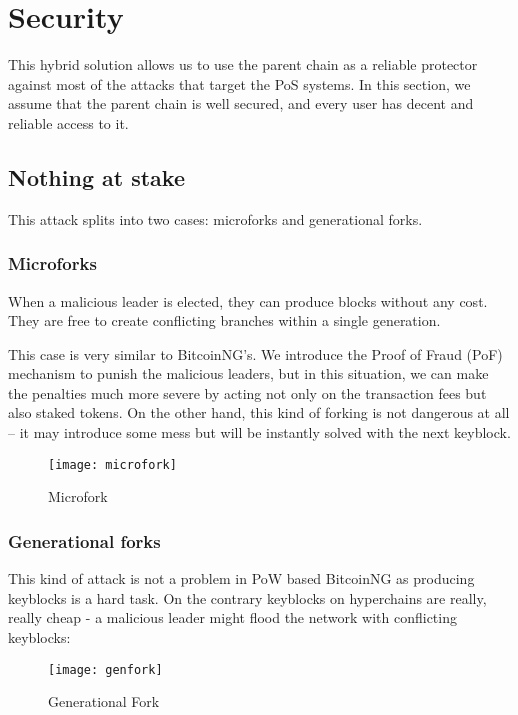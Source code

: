 \section{Security}

This hybrid solution allows us to use the parent chain as a
reliable protector against most of the attacks that target the PoS systems.
\cite{pos_attacks}
In this section, we assume that the parent chain is well secured, and every
user has decent and reliable access to it.

\subsection{Nothing at stake}

This attack splits into two cases: microforks and generational forks.

\subsubsection{Microforks}

When a malicious leader is elected, they can produce blocks without any cost.
They are free to create conflicting branches within a single generation.

This case is very similar to BitcoinNG's. We introduce the Proof of Fraud (PoF)
mechanism to punish the malicious leaders, but in this situation, we can make
the penalties much more severe by acting not only on the transaction fees
but also staked tokens. On the other hand, this kind of forking is not dangerous
at all – it may introduce some mess but will be instantly solved with the next keyblock.

\begin{figure}[h]
	\caption{Microfork}
	\centering
	\texttt{[image: microfork]}
\end{figure}

\subsubsection{Generational forks}

This kind of attack is not a problem in PoW based BitcoinNG as producing
keyblocks is a hard task. On the contrary keyblocks on hyperchains are really,
really cheap - a malicious leader might flood the network with conflicting
keyblocks:

\begin{figure}[h]
	\caption{Generational Fork}
	\centering
	\texttt{[image: genfork]}
\end{figure}

